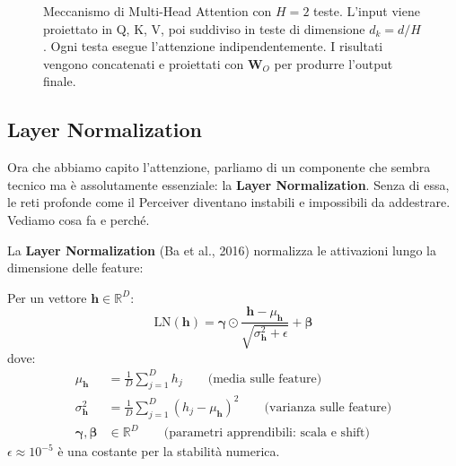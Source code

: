 \documentclass[12pt,a4paper]{article}
\begin{document}
\begin{figure}[H]
\caption{Meccanismo di Multi-Head Attention con $H = 2$ teste. L'input viene proiettato in Q, K, V, poi suddiviso in teste di dimensione $d_k = d/H$. Ogni testa esegue l'attenzione indipendentemente. I risultati vengono concatenati e proiettati con $\mathbf{W}_O$ per produrre l'output finale.}
\label{fig:multi_head_attention_detail}
\end{figure}


\subsection{Layer Normalization} \label{sec:layernorm}

Ora che abbiamo capito l'attenzione, parliamo di un componente che sembra tecnico ma \`e assolutamente essenziale: la \textbf{Layer Normalization}. Senza di essa, le reti profonde come il Perceiver diventano instabili e impossibili da addestrare. Vediamo cosa fa e perch\'e.

La \textbf{Layer Normalization} (Ba et al., 2016) normalizza le attivazioni lungo la dimensione delle feature:

\begin{formulabox}
Per un vettore $\mathbf{h} \in \mathbb{R}^D$:
\[
    \text{LN}(\mathbf{h}) = \boldsymbol{\gamma} \odot \frac{\mathbf{h} - \mu_{\mathbf{h}}}{\sqrt{\sigma^2_{\mathbf{h}} + \epsilon}} + \boldsymbol{\beta}
\]
dove:
\begin{align*}
    \mu_{\mathbf{h}} &= \frac{1}{D} \sum_{j=1}^{D} h_j \qquad \text{(media sulle feature)} \\
    \sigma^2_{\mathbf{h}} &= \frac{1}{D} \sum_{j=1}^{D} (h_j - \mu_{\mathbf{h}})^2 \qquad \text{(varianza sulle feature)} \\
    \boldsymbol{\gamma}, \boldsymbol{\beta} &\in \mathbb{R}^D \qquad \text{(parametri apprendibili: scala e shift)}
\end{align*}
$\epsilon \approx 10^{-5}$ \`e una costante per la stabilit\`a numerica.
\end{formulabox}
\end{document}
